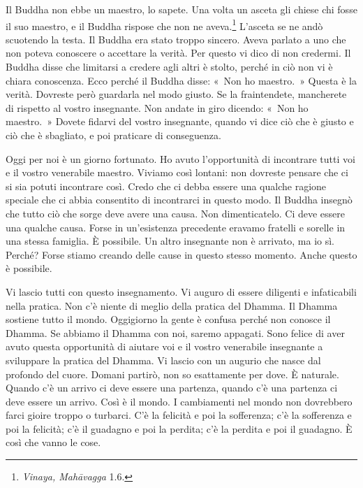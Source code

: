 Il Buddha non ebbe un maestro, lo sapete. Una volta un asceta gli chiese
chi fosse il suo maestro, e il Buddha rispose che non ne
aveva.\footnote{\emph{Vinaya, Mahāvagga} 1.6.} L'asceta se ne andò
scuotendo la testa. Il Buddha era stato troppo sincero. Aveva parlato a
uno che non poteva conoscere o accettare la verità. Per questo vi dico
di non credermi. Il Buddha disse che limitarsi a credere agli altri è
stolto, perché in ciò non vi è chiara conoscenza. Ecco perché il Buddha
disse: «~Non ho maestro.~» Questa è la verità. Dovreste però guardarla
nel modo giusto. Se la fraintendete, mancherete di rispetto al vostro
insegnante. Non andate in giro dicendo: «~Non ho maestro.~» Dovete
fidarvi del vostro insegnante, quando vi dice ciò che è giusto e ciò che
è sbagliato, e poi praticare di conseguenza.

Oggi per noi è un giorno fortunato. Ho avuto l'opportunità di incontrare
tutti voi e il vostro venerabile maestro. Viviamo così lontani: non
dovreste pensare che ci si sia potuti incontrare così. Credo che ci
debba essere una qualche ragione speciale che ci abbia consentito di
incontrarci in questo modo. Il Buddha insegnò che tutto ciò che sorge
deve avere una causa. Non dimenticatelo. Ci deve essere una qualche
causa. Forse in un'esistenza precedente eravamo fratelli e sorelle in
una stessa famiglia. È possibile. Un altro insegnante non è arrivato, ma
io sì. Perché? Forse stiamo creando delle cause in questo stesso
momento. Anche questo è possibile.

Vi lascio tutti con questo insegnamento. Vi auguro di essere diligenti e
infaticabili nella pratica. Non c'è niente di meglio della pratica del
Dhamma. Il Dhamma sostiene tutto il mondo. Oggigiorno la gente è confusa
perché non conosce il Dhamma. Se abbiamo il Dhamma con noi, saremo
appagati. Sono felice di aver avuto questa opportunità di aiutare voi e
il vostro venerabile insegnante a sviluppare la pratica del Dhamma. Vi
lascio con un augurio che nasce dal profondo del cuore. Domani partirò,
non so esattamente per dove. È naturale. Quando c'è un arrivo ci deve
essere una partenza, quando c'è una partenza ci deve essere un arrivo.
Così è il mondo. I cambiamenti nel mondo non dovrebbero farci gioire
troppo o turbarci. C'è la felicità e poi la sofferenza; c'è la
sofferenza e poi la felicità; c'è il guadagno e poi la perdita; c'è la
perdita e poi il guadagno. È così che vanno le cose.

